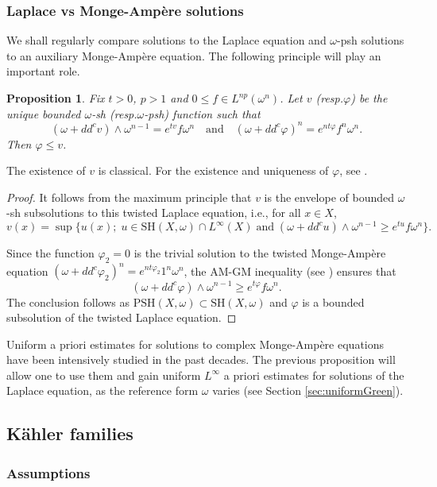 \documentclass[11pt]{article}
\newcommand{\ie}{i.e.,\xspace}
\newcommand{\resp}{resp.\xspace}
\newcommand{\Subsection}{\subsection}
\numberwithin{equation}{section}
\newtheorem{prop}[theorem]{Proposition}
\theoremstyle{definition}
\let\f\varphi
\newcommand \PSH {\mathrm{PSH}}
\newcommand \SH {\mathrm{SH}}
\begin{document}
\subsubsection{Laplace vs Monge-Ampère solutions} \label{sec:LaplacevsMA}

We shall regularly compare solutions to the Laplace equation
and $\omega$-psh solutions to an auxiliary Monge-Ampère equation.
The following principle will play an important role.

\begin{prop} \label{pro:comparisonLMA}
Fix $t>0$, $p>1$ and $0 \leq f \in L^{np}(\omega^n)$. Let $v$ (\resp $\f$) be the unique bounded $\omega$-sh (\resp $\omega$-psh)
function such that
\[
(\omega+dd^c v) \wedge \omega^{n-1}=e^{tv} f \omega^n
\quad \text{and} \quad
(\omega+dd^c \f)^n = e^{nt\f} f^n \omega^n.
\]
Then $\f \leq v$.
\end{prop}

The existence of $v$ is classical.
For the existence and uniqueness of $\f$, see \cite{GZbook}.

\begin{proof}
It follows from the maximum principle that $v$ is the envelope of bounded $\omega$-sh subsolutions to this twisted Laplace equation, \ie for all $x \in X$,
\[
v(x)=\sup \bigl\{ u(x); \; u \in \SH(X,\omega) \cap L^{\infty}(X)
\; \text{and} \;
(\omega+dd^c u) \wedge \omega^{n-1} \geq e^{tu} f \omega^n \bigr\}.
\]

Since the function $\f_2=0$ is the trivial solution to the twisted Monge-Ampère equation
$(\omega+dd^c \f_2)^n = e^{nt\f_2} 1^n \omega^n$,
the AM-GM inequality (see \cite[Th.\,2.12]{DK14}) ensures that
\[
(\omega+dd^c \f) \wedge \omega^{n-1} \geq e^{t \f} f \omega^n.
\]
The conclusion follows as $\PSH(X,\omega) \subset \SH(X,\omega)$
and $\f$ is a bounded subsolution of the twisted Laplace equation.
\end{proof}

Uniform a priori estimates for solutions to complex Monge-Ampère equations
have been intensively studied in the past decades. The previous proposition
will allow one to use them and gain uniform $L^{\infty}$ a priori estimates
for solutions of the Laplace equation, as the reference form $\omega$ varies
(see Section \ref{sec:uniformGreen}).

\Subsection{Kähler families} \label{sec:uniformMA}

\subsubsection{Assumptions}
\end{document}
